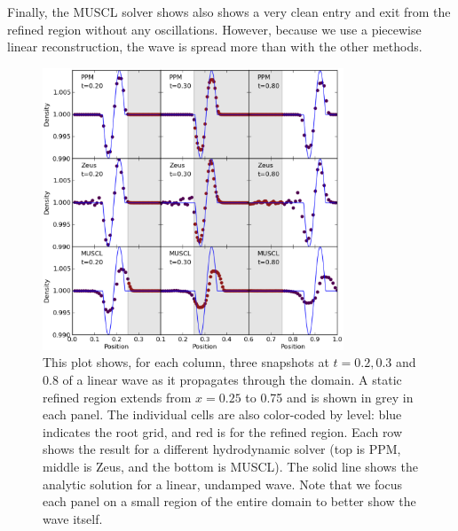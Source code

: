 Finally, the MUSCL solver shows also shows a very clean entry and exit from the refined region without any oscillations. However,
because we use a piecewise linear reconstruction, the wave is spread more than with the other methods.

\begin{figure}
\begin{center}
\includegraphics[width=0.8\textwidth]{figures/WavePool.eps}
\caption{This plot shows, for each column, three snapshots at $t=0.2, 0.3$ and 0.8 of a linear wave as it propagates through the domain.  A static refined region extends from $x = 0.25$ to 0.75 and is shown in grey in each panel.  The individual cells are also color-coded by level: blue indicates the root grid, and red is for the refined region.  Each row shows the result for a different hydrodynamic solver (top is PPM, middle is Zeus, and the bottom is MUSCL).   The solid line shows the analytic solution for a linear, undamped wave.  Note that we focus each panel on a small region of the entire domain to better show the wave itself.}
\label{fig.wavepool}
\end{center}
\end{figure}
